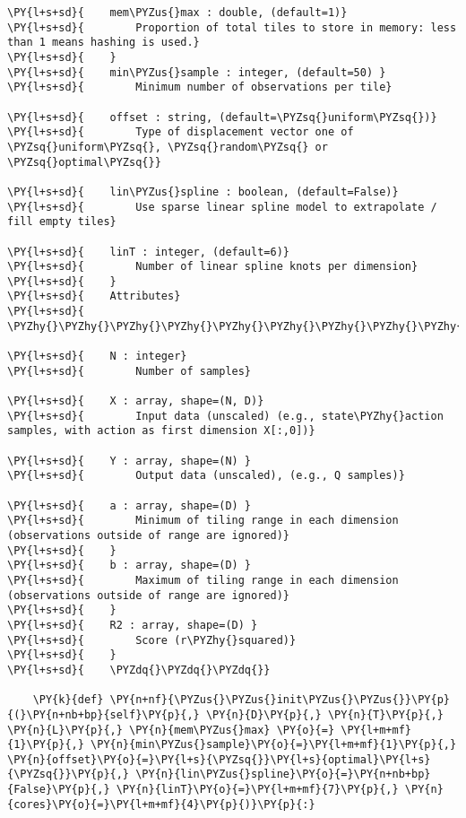 \begin{Verbatim}[commandchars=\\\{\}]
\PY{l+s+sd}{    mem\PYZus{}max : double, (default=1)}
\PY{l+s+sd}{        Proportion of total tiles to store in memory: less than 1 means hashing is used.}
\PY{l+s+sd}{    }
\PY{l+s+sd}{    min\PYZus{}sample : integer, (default=50) }
\PY{l+s+sd}{        Minimum number of observations per tile}

\PY{l+s+sd}{    offset : string, (default=\PYZsq{}uniform\PYZsq{})}
\PY{l+s+sd}{        Type of displacement vector one of \PYZsq{}uniform\PYZsq{}, \PYZsq{}random\PYZsq{} or \PYZsq{}optimal\PYZsq{}}

\PY{l+s+sd}{    lin\PYZus{}spline : boolean, (default=False)}
\PY{l+s+sd}{        Use sparse linear spline model to extrapolate / fill empty tiles}

\PY{l+s+sd}{    linT : integer, (default=6)}
\PY{l+s+sd}{        Number of linear spline knots per dimension}
\PY{l+s+sd}{    }
\PY{l+s+sd}{    Attributes}
\PY{l+s+sd}{    \PYZhy{}\PYZhy{}\PYZhy{}\PYZhy{}\PYZhy{}\PYZhy{}\PYZhy{}\PYZhy{}\PYZhy{}\PYZhy{}\PYZhy{}}

\PY{l+s+sd}{    N : integer}
\PY{l+s+sd}{        Number of samples}

\PY{l+s+sd}{    X : array, shape=(N, D)}
\PY{l+s+sd}{        Input data (unscaled) (e.g., state\PYZhy{}action samples, with action as first dimension X[:,0])}

\PY{l+s+sd}{    Y : array, shape=(N) }
\PY{l+s+sd}{        Output data (unscaled), (e.g., Q samples)}

\PY{l+s+sd}{    a : array, shape=(D) }
\PY{l+s+sd}{        Minimum of tiling range in each dimension (observations outside of range are ignored)}
\PY{l+s+sd}{    }
\PY{l+s+sd}{    b : array, shape=(D) }
\PY{l+s+sd}{        Maximum of tiling range in each dimension (observations outside of range are ignored)}
\PY{l+s+sd}{    }
\PY{l+s+sd}{    R2 : array, shape=(D) }
\PY{l+s+sd}{        Score (r\PYZhy{}squared)}
\PY{l+s+sd}{    }
\PY{l+s+sd}{    \PYZdq{}\PYZdq{}\PYZdq{}} 

    \PY{k}{def} \PY{n+nf}{\PYZus{}\PYZus{}init\PYZus{}\PYZus{}}\PY{p}{(}\PY{n+nb+bp}{self}\PY{p}{,} \PY{n}{D}\PY{p}{,} \PY{n}{T}\PY{p}{,} \PY{n}{L}\PY{p}{,} \PY{n}{mem\PYZus{}max} \PY{o}{=} \PY{l+m+mf}{1}\PY{p}{,} \PY{n}{min\PYZus{}sample}\PY{o}{=}\PY{l+m+mf}{1}\PY{p}{,} \PY{n}{offset}\PY{o}{=}\PY{l+s}{\PYZsq{}}\PY{l+s}{optimal}\PY{l+s}{\PYZsq{}}\PY{p}{,} \PY{n}{lin\PYZus{}spline}\PY{o}{=}\PY{n+nb+bp}{False}\PY{p}{,} \PY{n}{linT}\PY{o}{=}\PY{l+m+mf}{7}\PY{p}{,} \PY{n}{cores}\PY{o}{=}\PY{l+m+mf}{4}\PY{p}{)}\PY{p}{:}


\end{Verbatim}
